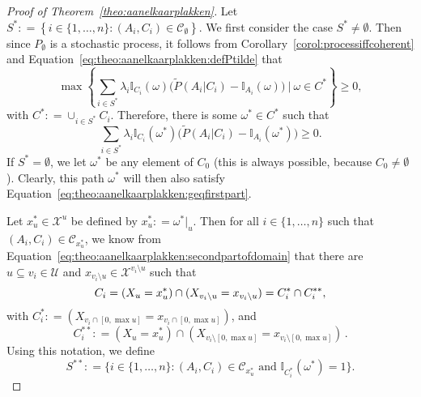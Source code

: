 \documentclass[10pt,a4paper]{paper}
\theoremstyle{definition}
\newcommand{\states}{\mathcal{X}}
\newcommand{\ind}[1]{\mathbb{I}_{#1}}
\newcommand{\coloneqq}{:\!=}
\begin{document}
\begin{proof}[Proof of Theorem~\ref{theo:aanelkaarplakken}]
Let $S^*\coloneqq\left\{i\in\{1,\dots,n\}\colon(A_i,C_i)\in\mathcal{C}_\emptyset\right\}$. We first consider the case $S^*\neq\emptyset$. Then since $P_\emptyset$ is a stochastic process, it follows from Corollary~\ref{corol:processiffcoherent} and Equation~\eqref{eq:theo:aanelkaarplakken:defPtilde} that
\begin{equation*}%
\max\left\{\sum_{i\in S^*}\lambda_i\ind{C_i}(\omega)\bigl(\tilde{P}(A_i\vert C_i)-\ind{A_i}(\omega)\bigr)~\Bigg\vert~\omega\in C^*\right\}\geq0,
\end{equation*}
with $C^*\coloneqq\cup_{i\in S^*}C_i$. Therefore, there is some $\omega^*\in C^*$ such that
\begin{equation}\label{eq:theo:aanelkaarplakken:geqfirstpart}
\sum_{i\in S^*}\lambda_i\ind{C_i}(\omega^*)\bigl(\tilde{P}(A_i\vert C_i)-\ind{A_i}(\omega^*)\bigr)\geq0.
\end{equation}
If $S^*=\emptyset$, we let $\omega^*$ be any element of $C_0$ (this is always possible, because $C_0\neq\emptyset$). Clearly, this path $\omega^*$ will then also satisfy Equation~\eqref{eq:theo:aanelkaarplakken:geqfirstpart}.


Let $x_u^*\in\states^u$ be defined by $x_u^*\coloneqq \omega^*\vert_u$.
Then for all $i\in\{1,\dots,n\}$ such that $(A_i,C_i)\in\mathcal{C}_{x_u^*}$, we know from Equation~\eqref{eq:theo:aanelkaarplakken:secondpartofdomain} that there are $u\subseteq v_i\in\mathcal{U}$ and $x_{v_i\setminus u}\in\states^{v_i\setminus u}$ such that
\begin{equation}\label{eq:theo:aanelkaarplakken:Cisplit}
C_i=(X_u=x_u^*)\cap(X_{v_i\setminus u}=x_{v_i\setminus u})=C_i^*\cap C_i^{**},\vspace{2mm}
\end{equation}
with $C_i^{*}\coloneqq(X_{v_i\cap [0,\max u]}=x_{v_i\cap [0,\max u]})$, and
\begin{equation}\label{eq:theo:aanelkaarplakken:Cistarstar}
C_i^{**}\coloneqq(X_u=x_u^*)\cap(X_{v_i\setminus [0,\max u]}=x_{v_i\setminus [0,\max u]})\,.
\end{equation}
Using this notation, we define
\begin{equation}\label{eq:theo:aanelkaarplakken:Sstarstardef}
S^{**}\coloneqq
\{
i\in\{1,\dots,n\}
\colon
(A_i,C_i)\in\mathcal{C}_{x_u^*}
\text{~and~}
\ind{C_i^*}(\omega^*)=1
\}.
\end{equation}



\end{proof}
\end{document}
